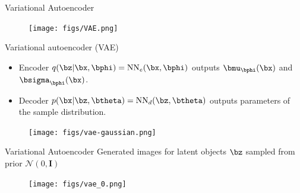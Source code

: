 \begin{frame}{Variational Autoencoder}
	\begin{figure}[h]
		\centering
		\texttt{[image: figs/VAE.png]}
	\end{figure}
\end{frame}
\begin{frame}{Variational autoencoder (VAE)}
	\begin{itemize}
		\item Encoder $q(\bz | \bx, \bphi) = \text{NN}_e(\bx, \bphi)$ outputs $\bmu_{\bphi}(\bx)$ and $\bsigma_{\bphi}(\bx)$.
		\item Decoder $p(\bx | \bz, \btheta) = \text{NN}_d(\bz, \btheta)$ outputs parameters of the sample distribution.
	\end{itemize}
	\begin{figure}[h]
		\centering
		\texttt{[image: figs/vae-gaussian.png]}
	\end{figure}
	
\end{frame}
\begin{frame}{Variational Autoencoder}
	Generated images for latent objects $\bz$ sampled from prior $\mathcal{N}(0, \mathbf{I})$
	\begin{figure}[h]
		\centering
		\texttt{[image: figs/vae\_0.png]}
	\end{figure}
\end{frame}
